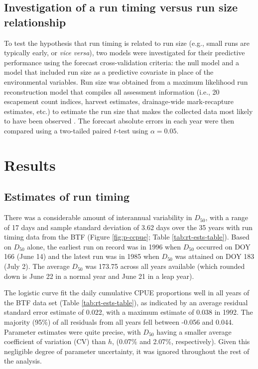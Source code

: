 \documentclass[12pt,]{book}
\theoremstyle{definition}
\theoremstyle{definition}
\theoremstyle{definition}
\theoremstyle{remark}
\begin{document}
\subsection{Investigation of a run timing versus run size
relationship}\label{investigation-of-a-run-timing-versus-run-size-relationship}

\noindent
To test the hypothesis that run timing is related to run size (e.g.,
small runs are typically early, or \emph{vice versa}), two models were
investigated for their predictive performance using the forecast
cross-validation criteria: the null model and a model that included run
size as a predictive covariate in place of the environmental variables.
Run size was obtained from a maximum likelihood run reconstruction model
that compiles all assessment information (i.e., 20 escapement count
indices, harvest estimates, drainage-wide mark-recapture estimates,
etc.) to estimate the run size that makes the collected data most likely
to have been observed \citep{bue-etal-2012, liller-etal-2018}. The
forecast absolute errors in each year were then compared using a
two-tailed paired \(t\)-test using \(\alpha = 0.05\).

\section{Results}\label{results}

\subsection{Estimates of run timing}\label{estimates-of-run-timing}

\noindent
There was a considerable amount of interannual variability in
\(D_{50}\), with a range of 17 days and sample standard deviation of
3.62 days over the 35 years with run timing data from the BTF (Figure
\ref{fig:p-ccpue}; Table \ref{tab:rt-ests-table}). Based on \(D_{50}\)
alone, the earliest run on record was in 1996 when \(D_{50}\) occurred
on DOY 166 (June 14) and the latest run was in 1985 when \(D_{50}\) was
attained on DOY 183 (July 2). The average \(D_{50}\) was 173.75 across
all years available (which rounded down is June 22 in a normal year and
June 21 in a leap year).

The logistic curve fit the daily cumulative CPUE proportions well in all
years of the BTF data set (Table \ref{tab:rt-ests-table}), as indicated
by an average residual standard error estimate of 0.022, with a maximum
estimate of 0.038 in 1992. The majority (95\%) of all residuals from all
years fell between -0.056 and 0.044. Parameter estimates were quite
precise, with \(D_{50}\) having a smaller average coefficient of
variation (CV) than \(h\), (0.07\% and 2.07\%, respectively). Given this
negligible degree of parameter uncertainty, it was ignored throughout
the rest of the analysis.
\end{document}

